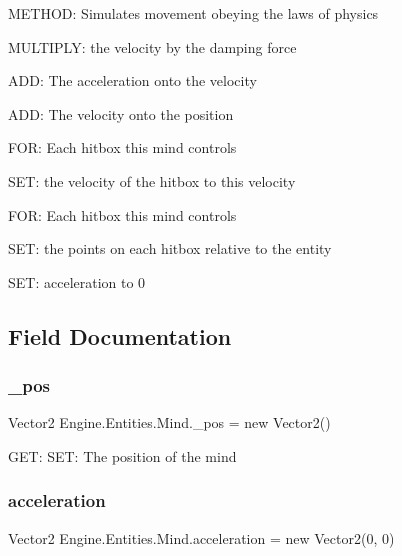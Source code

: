 M\+E\+T\+H\+OD\+: Simulates movement obeying the laws of physics 

M\+U\+L\+T\+I\+P\+LY\+: the velocity by the damping force

A\+DD\+: The acceleration onto the velocity

A\+DD\+: The velocity onto the position

F\+OR\+: Each hitbox this mind controls

S\+ET\+: the velocity of the hitbox to this velocity

F\+OR\+: Each hitbox this mind controls

S\+ET\+: the points on each hitbox relative to the entity

S\+ET\+: acceleration to 0 

\subsection{Field Documentation}
\mbox{\label{a00318_a5804486ad9da9f6220f390e94eb08ab7}} 
\subsubsection{\texorpdfstring{\+\_\+pos}{\_pos}}
{\footnotesize\ttfamily Vector2 Engine.\+Entities.\+Mind.\+\_\+pos = new Vector2()\hspace{0.3cm}{\ttfamily [protected]}}



G\+ET\+: S\+ET\+: The position of the mind 

\mbox{\label{a00318_a97534caf477680d0dcbe7021cc2b5a92}} 
\subsubsection{\texorpdfstring{acceleration}{acceleration}}
{\footnotesize\ttfamily Vector2 Engine.\+Entities.\+Mind.\+acceleration = new Vector2(0, 0)\hspace{0.3cm}{\ttfamily [protected]}}



